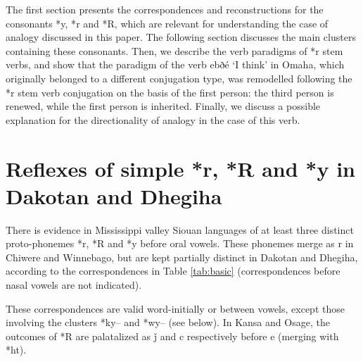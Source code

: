 \documentclass[oneside,a4paper,11pt]{article}
\newcommand{\ipa}[1]{{\phon#1}} %
\begin{document}
 The first section presents the correspondences and reconstructions for the  consonants *\ipa{y}, *\ipa{r} and *\ipa{R}, which are relevant for understanding the case of analogy discussed in this paper. The following section discusses the main clusters containing these consonants. Then, we describe the verb paradigms of *\ipa{r} stem verbs, and show that the paradigm of the verb  \ipa{ebðé} `I think' in Omaha, which originally belonged to a different conjugation type, was remodelled following the *\ipa{r} stem verb conjugation on the basis of the first person: the third  person is renewed, while the first person is inherited. Finally, we discuss a possible explanation for the directionality of analogy in the case of this verb.
 

\section{Reflexes of simple *r, *R and *y in Dakotan and Dhegiha}
There is evidence in Mississippi valley Siouan languages of at least three distinct proto-phonemes *\ipa{r}, *\ipa{R} and *\ipa{y} before oral vowels. These phonemes merge as \ipa{r} in Chiwere and Winnebago, but are kept partially distinct in Dakotan and Dhegiha, according to the   correspondences in   Table \ref{tab:basic} (correspondences before nasal vowels are not indicated). 

These correspondences are valid word-initially or between vowels, except those involving the clusters *\ipa{ky--} and *\ipa{wy--} (see below). In Kansa and Osage, the outcomes of *\ipa{R} are palatalized as \ipa{ǰ} and \ipa{c} respectively before \ipa{e} (merging with *\ipa{ht}).
\end{document}
